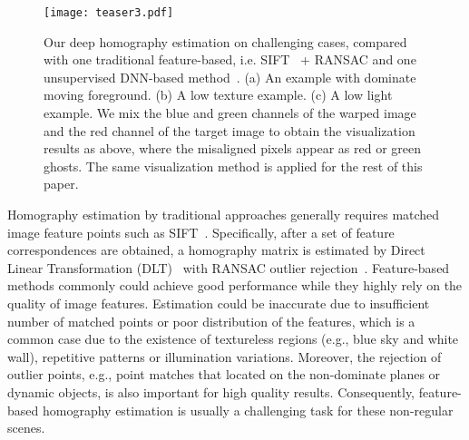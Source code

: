 \documentclass[runningheads]{llncs}
\begin{document}
\begin{figure}[t]
  \centering
  \texttt{[image: teaser3.pdf]}\\
  \caption{Our deep homography estimation on challenging cases, compared with one traditional feature-based, i.e. SIFT~\cite{lowe2004distinctive} + RANSAC and one unsupervised DNN-based method~\cite{nguyen2018unsupervised}. (a) An example with dominate moving foreground. (b) A low texture example. (c) A low light example. We mix the blue and green channels of the warped image and the red channel of the target image to obtain the visualization results as above, where the misaligned pixels appear as red or green ghosts. The same visualization method is applied for the rest of this paper.}\label{fig:teaser} \end{figure}

Homography estimation by traditional approaches generally requires matched image feature points such as SIFT~\cite{lowe2004distinctive}. Specifically, after a set of feature correspondences are obtained, a homography matrix is estimated by Direct Linear Transformation (DLT)~\cite{hartley2003multiple} with RANSAC outlier rejection~\cite{fischler1981random}. Feature-based methods commonly could achieve good performance while they highly rely on the quality of image features. Estimation could be inaccurate due to insufficient number of matched points or poor distribution of the features, which is a common case due to the existence of textureless regions (e.g., blue sky and white wall), repetitive patterns or illumination variations. Moreover, the rejection of outlier points, e.g., point matches that located on the non-dominate planes or dynamic objects, is also important for high quality results. Consequently, feature-based homography estimation is usually a challenging task for these non-regular scenes.
\end{document}
